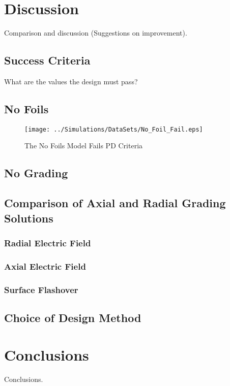 
\section{Discussion} \label{s:Discussion}
Comparison and discussion (Suggestions on improvement).
\subsection{Success Criteria}
What are the values the design must pass?

\subsection{No Foils}
\begin{figure}[!h]
  \centering
    \texttt{[image: ../Simulations/DataSets/No\_Foil\_Fail.eps]} 
\caption{The No Foils Model Fails PD Criteria}
\label{Figure:NoFoilsFail}
\end{figure}

\subsection{No Grading}

\subsection{Comparison of Axial and Radial Grading Solutions}

\subsubsection{Radial Electric Field}

\subsubsection{Axial Electric Field}

\subsubsection{Surface Flashover}

\subsection{Choice of Design Method}

\section{Conclusions}
Conclusions.